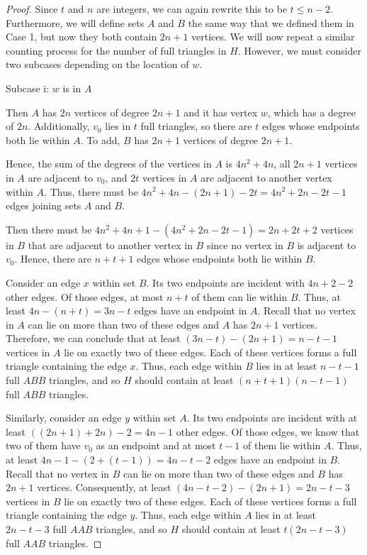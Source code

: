 \documentclass[10pt]{amsart}
\begin{document}
\begin{proof}
    Since $t$ and $n$ are integers, we can again rewrite this to be $t \le n - 2$. Furthermore, we 
    will define sets $A$ and $B$ the same way that we defined them in Case 1, but now they both contain 
    $2n + 1$ vertices. We will now repeat a similar counting process for the number of full triangles 
    in $H$. However, we must consider two subcases depending on the location of $w$.

    \noindent Subcase i: $w$ is in $A$

    Then $A$ has $2n$ vertices of degree $2n + 1$ and it has vertex $w$, which has a degree of $2n$. 
    Additionally, $v_0$ lies in $t$ full triangles, so there are $t$ edges whose endpoints both 
    lie within $A$. To add, $B$ has $2n + 1$ vertices of degree $2n + 1$.

    Hence, the sum of the degrees of the vertices in $A$ is $4n^2 + 4n$, all $2n + 1$ vertices 
    in $A$ are adjacent to $v_0$, and $2t$ vertices in $A$ are adjacent to another vertex 
    within $A$. Thus, there must be $4n^2 + 4n - (2n + 1) - 2t = 4n^2 + 2n - 2t - 1$ edges 
    joining sets $A$ and $B$.

    Then there must be $4n^2 + 4n + 1 - (4n^2 + 2n - 2t - 1) = 2n + 2t + 2$ vertices in $B$ 
    that are adjacent to another vertex in $B$ since no vertex in $B$ is adjacent to $v_0$. 
    Hence, there are $n + t + 1$ edges whose endpoints both lie within $B$.

    Consider an edge $x$ within set $B$. Its two endpoints are incident with $4n + 2 - 2$ other edges. 
    Of those edges, at most $n + t$ of them can lie within $B$. Thus, at least 
    $4n - (n + t) = 3n - t$ edges have an endpoint in $A$. Recall that no vertex in $A$ can lie 
    on more than two of these edges and $A$ has $2n + 1$ vertices. Therefore, we can conclude that 
    at least $(3n - t) - (2n + 1) = n - t - 1$ vertices in $A$ lie on exactly two of these edges. Each of 
    these vertices forms a full triangle containing the edge $x$.
    Thus, each edge within $B$ lies in at least $n - t - 1$ full $ABB$ triangles, and so $H$ should 
    contain at least $(n + t + 1)(n - t - 1)$ full $ABB$ triangles.

    Similarly, consider an edge $y$ within set $A$. Its two endpoints are incident with at least
    $((2n + 1) + 2n) - 2 = 4n - 1$ other edges. Of those edges, we know that two of them have $v_0$ as 
    an endpoint and at most $t - 1$ of them lie within $A$. Thus, at least 
    $4n - 1 - (2 + (t - 1)) = 4n - t - 2$ edges have an endpoint in $B$. Recall that no vertex in $B$ 
    can lie on more than two of these edges and $B$ has $2n + 1$ vertices. Consequently, at least 
    $(4n - t - 2) - (2n + 1) = 2n - t - 3$ vertices in $B$ lie on exactly two of these edges. Each of 
    these vertices forms a full triangle containing the edge $y$.
    Thus, each edge within $A$ lies in at least $2n - t - 3$ full $AAB$ triangles, and so $H$ should 
    contain at least $t(2n - t - 3)$ full $AAB$ triangles. 
    

\end{proof}
\end{document}
